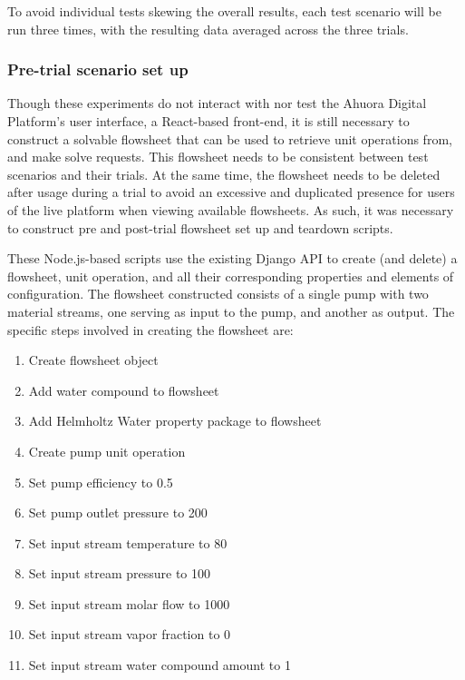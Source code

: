 To avoid individual tests skewing the overall results, each test scenario will be run three times, with the resulting data averaged across the three trials.

\subsubsection{Pre-trial scenario set up}

Though these experiments do not interact with nor test the Ahuora Digital Platform's user interface, a React-based front-end, it is still necessary to construct a solvable flowsheet that can be used to retrieve unit operations from, and make solve requests. This flowsheet needs to be consistent between test scenarios and their trials. At the same time, the flowsheet needs to be deleted after usage during a trial to avoid an excessive and duplicated presence for users of the live platform when viewing available flowsheets. As such, it was necessary to construct pre and post-trial flowsheet set up and teardown scripts.

These Node.js-based scripts use the existing Django API to create (and delete) a flowsheet, unit operation, and all their corresponding properties and elements of configuration. The flowsheet constructed consists of a single pump with two material streams, one serving as input to the pump, and another as output. The specific steps involved in creating the flowsheet are:

\begin{enumerate}[itemsep=0pt]
    \item Create flowsheet object
    \item Add water compound to flowsheet
    \item Add Helmholtz Water property package to flowsheet
    \item Create pump unit operation
    \item Set pump efficiency to 0.5
    \item Set pump outlet pressure to 200
    \item Set input stream temperature to 80
    \item Set input stream pressure to 100
    \item Set input stream molar flow to 1000
    \item Set input stream vapor fraction to 0
    \item Set input stream water compound amount to 1
\end{enumerate}

